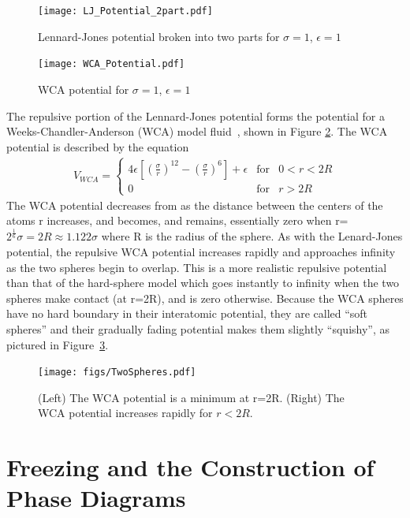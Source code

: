 \documentclass[double,12pt]{beavtex}
\begin{document}
\begin{figure}
    \centering
    \texttt{[image: LJ\_Potential\_2part.pdf]}
    \caption{Lennard-Jones potential broken into two parts for $\sigma=1$, $\epsilon=1$}
    \label{fig:LJ_potential_2parts}
  \end{figure}

\begin{figure}
    \centering
    \texttt{[image: WCA\_Potential.pdf]}
    \caption{WCA potential for $\sigma=1$, $\epsilon=1$}
    \label{fig:WCA_potential}
  \end{figure}

The repulsive portion of the Lennard-Jones potential forms the potential for a 
Weeks-Chandler-Anderson (WCA) model fluid~\cite{andersen1971relationship},
shown in Figure \ref{fig:WCA_potential}. 
The WCA potential is described by the equation 
\begin{align} \label{eq:VWCA}
    V_{WCA}=\left\{\begin{array}{rcl} {4\epsilon{\left[\left(\frac{\sigma}{r}\right)^{12} - \left(\frac{\sigma}{r}\right)^6 \right]}+\epsilon} & \mbox{for} & 0<r<{2R} \\ 0 & \mbox{for} & r>2R \end{array}\right.
\end{align} 
The WCA potential decreases from as the distance between the 
centers of the atoms r increases, and becomes, and remains, essentially 
zero when r=$2^\frac{1}{6}\sigma=2R\approx{1.122}\sigma$ where R is the 
radius of the sphere. 
As with the Lenard-Jones potential, the repulsive WCA potential increases 
rapidly and approaches infinity as the two spheres begin to overlap. This 
is a more realistic repulsive potential than that of the hard-sphere model 
which goes instantly to infinity when the two spheres make contact (at r=2R), 
and is zero otherwise. Because the WCA spheres have no hard boundary in 
their interatomic potential, they are called ``soft spheres'' and their 
gradually fading potential makes them slightly ``squishy'', as pictured in
Figure~\ref{fig:TwoSpheres}.

\begin{figure}
    \centering
    \texttt{[image: figs/TwoSpheres.pdf]} 
    \caption{(Left) The WCA potential is a minimum at r=2R. 
             (Right) The WCA potential increases rapidly for $r<2R$.}
    \label{fig:TwoSpheres}
\end{figure} 
    
\section{Freezing and the Construction of Phase Diagrams}
\end{document}
